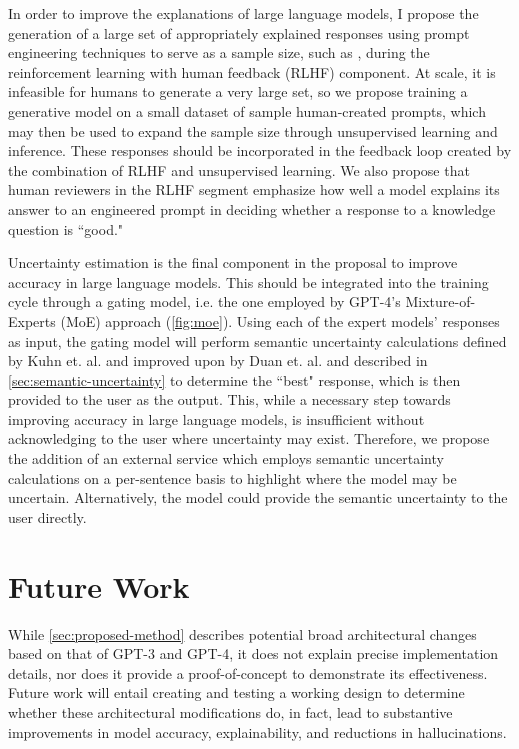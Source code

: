 \documentclass[letterpaper,12pt]{article}
\begin{document}
In order to improve the explanations of large language models, I propose the generation of a large set of appropriately explained responses using prompt engineering techniques to serve as a sample size, such as \cite{wei2022chain} \cite{scidebug}, during the reinforcement learning with human feedback (RLHF) component. At scale, it is infeasible for humans to generate a very large set, so we propose training a generative model on a small dataset of sample human-created prompts, which may then be used to expand the sample size through unsupervised learning and inference. These responses should be incorporated in the feedback loop created by the combination of RLHF and unsupervised learning. We also propose that human reviewers in the RLHF segment emphasize how well a model explains its answer to an engineered prompt in deciding whether a response to a knowledge question is ``good."

Uncertainty estimation is the final component in the proposal to improve accuracy in large language models. This should be integrated into the training cycle through a gating model, i.e. the one employed by GPT-4's Mixture-of-Experts (MoE) approach (\cref{fig:moe}). Using each of the expert models' responses as input, the gating model will perform semantic uncertainty calculations defined by Kuhn et. al. \cite{kuhn2023semantic} and improved upon by Duan et. al. \cite{duan2023shifting} and described in \cref{sec:semantic-uncertainty} to determine the ``best" response, which is then provided to the user as the output. This, while a necessary step towards improving accuracy in large language models, is insufficient without acknowledging to the user where uncertainty may exist. Therefore, we propose the addition of an external service which employs semantic uncertainty calculations on a per-sentence basis to highlight where the model may be uncertain. Alternatively, the model could provide the semantic uncertainty to the user directly.

\section{Future Work}
While \cref{sec:proposed-method} describes potential broad architectural changes based on that of GPT-3 and GPT-4, it does not explain precise implementation details, nor does it provide a proof-of-concept to demonstrate its effectiveness. Future work will entail creating and testing a working design to determine whether these architectural modifications do, in fact, lead to substantive improvements in model accuracy, explainability, and reductions in hallucinations.
\end{document}

